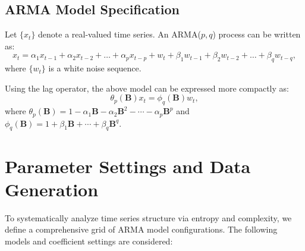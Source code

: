 \documentclass[12pt,a4paper]{article}
\begin{document}
\subsection{ARMA Model Specification}

Let $\{x_t\}$ denote a real-valued time series. An ARMA($p,q$) process can be written as:
\begin{equation}
	x_t = \alpha_1 x_{t-1} + \alpha_2 x_{t-2} + \dots + \alpha_p x_{t-p} + w_t + \beta_1 w_{t-1} + \beta_2 w_{t-2} + \dots + \beta_q w_{t-q},
	\label{eq:arma}
\end{equation}
where $\{w_t\}$ is a white noise sequence.

Using the lag operator, the above model can be expressed more compactly as:
\begin{equation}
	\theta_p(\mathbf{B}) x_t = \phi_q(\mathbf{B}) w_t,
	\label{eq:arma_polynomial}
\end{equation}
where $\theta_p(\mathbf{B}) = 1 - \alpha_1 \mathbf{B} - \alpha_2 \mathbf{B}^2 - \cdots - \alpha_p \mathbf{B}^p$ and $\phi_q(\mathbf{B}) = 1 + \beta_1 \mathbf{B} + \cdots + \beta_q \mathbf{B}^q$.

\section{Parameter Settings and Data Generation}

To systematically analyze time series structure via entropy and complexity, we define a comprehensive grid of ARMA model configurations. The following models and coefficient settings are considered:
\end{document}
